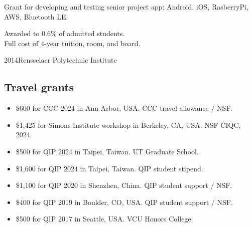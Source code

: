 \documentclass[11pt,letterpaper,serif]{moderncv}
\begin{document}

{
\begin{adjustwidth}{.25in}{}
	Grant for developing and testing senior project app: Android, iOS, RasberryPi, AWS, Bluetooth LE.
\end{adjustwidth}
}

{
\begin{adjustwidth}{.25in}{}
	Awarded to 0.6\% of admitted students.\\
	Full cost of 4-year tuition, room, and board.
\end{adjustwidth}
}


 {2014}{Rensselaer Polytechnic Institute}{}

\subsection{Travel grants}

\begin{itemize}
	\item \$600 for CCC 2024 in Ann Arbor, USA. CCC travel allowance / NSF.
	\item \$1,425 for Simons Institute workshop in Berkeley, CA, USA. NSF CIQC, 2024.
	\item \$500 for QIP 2024 in Taipei, Taiwan. UT Graduate School.
	\item \$1,600 for QIP 2024 in Taipei, Taiwan. QIP student stipend.
	\item \$1,100 for QIP 2020 in Shenzhen, China. QIP student support / NSF.
	\item \$400 for QIP 2019 in Boulder, CO, USA. QIP student support / NSF.
	\item \$500 for QIP 2017 in Seattle, USA. VCU Honors College.
\end{itemize}

\end{document}
